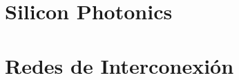 


    
    
    \chapter{Silicon Photonics}
    
    

    \chapter{Redes de Interconexión}

    
    


